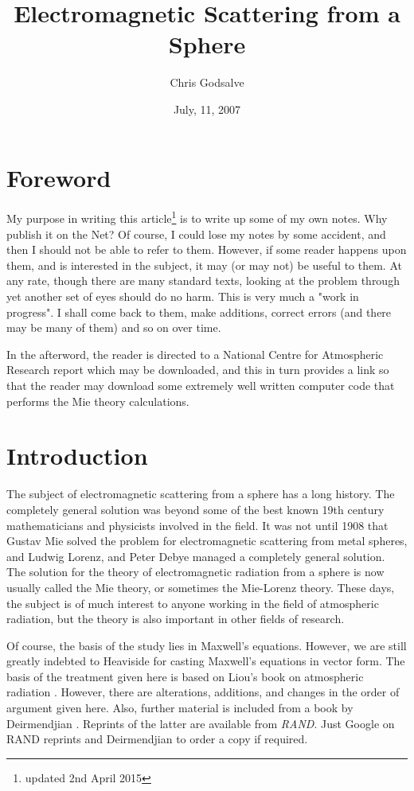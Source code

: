 \documentclass[12pt]{article}
\begin{document}
\thispagestyle{empty}

\title{Electromagnetic Scattering from a Sphere}
\author{Chris Godsalve}
\date{July, 11, 2007}
\maketitle

\tableofcontents

\section{Foreword}

My purpose in writing this article\footnote{updated 2nd April 2015} is to write up some of my own notes. 
Why publish it on the Net? Of course, I could lose my notes by some 
accident, and then I should not be able to refer to them. However, if some
reader happens upon them, and is interested in the subject, it may (or may not)
 be useful to them. At any rate, though there are many standard texts, looking at the problem through yet another set of eyes should do no harm. This is very much a "work in progress". I shall come back to them, make additions, correct errors (and there may be many of them) and so on over time.

In the afterword, the reader is directed to a National Centre for Atmospheric Research report which may be downloaded, and this in turn provides a link so that the reader may download some extremely well written computer code that performs the Mie theory calculations.

\section{Introduction}

The subject of electromagnetic scattering from a sphere has a long history. The completely general solution was beyond some of the best known 19th century mathematicians and physicists involved in the field. It was not until 1908 that Gustav  Mie solved the problem for electromagnetic  scattering from metal spheres, and Ludwig Lorenz, and Peter Debye managed a completely general solution. The solution for the theory of electromagnetic radiation from a sphere is now usually called the Mie theory, or sometimes the Mie-Lorenz theory. These days, the subject is of much interest to anyone working in the field of atmospheric radiation, but the theory is also important in other fields of research.

Of course, the basis of the study lies in Maxwell's equations. However, we are still greatly indebted to Heaviside for casting Maxwell's equations in vector form. The basis of the treatment given here is based on Liou's book on atmospheric radiation \cite{Liou:Miebib}. However, there are alterations, additions, and changes in the order of argument given here. Also, further material is included from  a book by Deirmendjian \cite{Deirmendjian:Miebib}. Reprints of the latter are available from {\it RAND}. Just Google on RAND reprints and Deirmendjian to order a copy if required.
\end{document}
